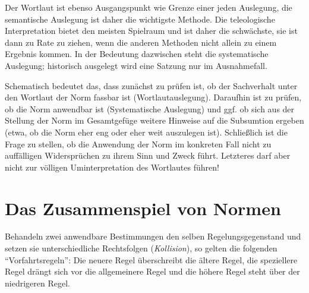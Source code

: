 Der Wortlaut ist ebenso Ausgangspunkt wie Grenze einer jeden Auslegung, die semantische Auslegung ist daher die wichtigste Methode. Die teleologische Interpretation bietet den meisten Spielraum und ist daher die schwächste, sie ist dann zu Rate zu ziehen, wenn die anderen Methoden nicht allein zu einem Ergebnis kommen. In der Bedeutung dazwischen steht die systematische Auslegung; historisch ausgelegt wird eine Satzung nur im Ausnahmefall.

Schematisch bedeutet das, dass zunächst zu prüfen ist, ob der Sachverhalt unter den Wortlaut der Norm fassbar ist (Wortlautauslegung). Daraufhin ist zu prüfen, ob die Norm anwendbar ist (Systematische Auslegung) und ggf. ob sich aus der Stellung der Norm im Gesamtgefüge weitere Hinweise auf die Subsumtion ergeben (etwa, ob die Norm eher eng oder eher weit auszulegen ist). Schließlich ist die Frage zu stellen, ob die Anwendung der Norm im konkreten Fall nicht zu auffälligen Widersprüchen zu ihrem Sinn und Zweck führt. Letzteres darf aber nicht zur völligen Uminterpretation des Wortlautes führen!

\section{Das Zusammenspiel von Normen}
Behandeln zwei anwendbare Bestimmungen den selben Regelungsgegenstand und setzen sie unterschiedliche Rechtsfolgen (\emph{Kollision}), so gelten die folgenden \enquote{Vorfahrtsregeln}: Die neuere Regel überschreibt die ältere Regel, die speziellere Regel drängt sich vor die allgemeinere Regel und die höhere Regel steht über der niedrigeren Regel.


